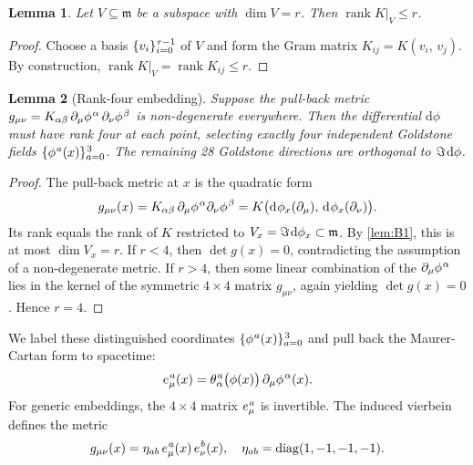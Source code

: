 \documentclass[pdflatex,sn-mathphys-num]{sn-jnl}
\theoremstyle{thmstyleone}
\newtheorem{lemma}{Lemma}
\theoremstyle{thmstyletwo}%
\theoremstyle{thmstylethree}%
\newcommand{\s}{\hspace{.1em}}
\newcommand{\sm}{\hspace{.065em}}
\newcommand{\smexp}[1]{^{\sm #1}}
\begin{document}
\begin{lemma}\label{lem:B1}
Let \(V\subseteq\mathfrak m\) be a subspace with $\dim V = r$.
Then \(\operatorname{rank} K|_{V} \leq r\).
\end{lemma}

\begin{proof}
Choose a basis \(\{v_{i}\}_{i=0}\smexp{r-1}\) of \(V\) and form the Gram
matrix \(K_{ij}=K(v_{i},\,v_{j})\).
By construction, \(\operatorname{rank} K|_{V}=\operatorname{rank} K_{ij} \le r\).
\end{proof}

\begin{lemma}[Rank-four embedding]\label{lem:Rank4}
Suppose the pull-back metric
$g_{\mu\nu}=K_{\alpha\beta}\,\partial_\mu\phi\smexp{\alpha}\,\partial_\nu\phi\smexp{\beta}$
is non-degenerate everywhere.
Then the differential $\mathrm d\phi$ must have rank four at each point,
selecting exactly four independent Goldstone fields
$\{\phi\smexp{ a}(x)\}_{a=0}\smexp3$.
The remaining 28 Goldstone directions are orthogonal to $\Im\s \mathrm d\phi$.
\end{lemma}

\begin{proof}
The pull-back metric at \(x\) is the quadratic form
\[
  g_{\mu\nu}(x)
  =K_{\alpha\beta}\,\partial_\mu\phi\smexp{\alpha}\partial_\nu\phi\smexp{\beta}
  =K\bigl(\mathrm d\sm\phi_x(\partial_\mu),\,
          \mathrm d\sm\phi_x(\partial_\nu)\bigr).
\]
Its rank equals the rank of \(K\) restricted to
\(V_x=\Im\s\mathrm d\phi_x\subset\mathfrak m\).
By \autoref{lem:B1}, this is at most \(\dim V_x=r\).
If \(r<4\), then \(\det g(x)=0\), contradicting the assumption of a non-degenerate
metric.
If \(r>4\), then some linear combination of the \(\partial_\mu\phi\smexp{\alpha}\)
lies in the kernel of the symmetric $4\times4$ matrix \(g_{\mu\nu}\), again yielding
\(\det g(x)=0\).
Hence \(r=4\).
\end{proof}

We label these distinguished coordinates $\{\phi\smexp{ a}(x)\}_{a=0}\smexp3$
and pull back the Maurer-Cartan form to spacetime:
\begin{equation}\label{eq:eDef}
  e_\mu\smexp{ a}(x)=
  \theta\smexp{ a}_{\alpha}\bigl(\phi(x)\bigr)\,
  \partial_\mu\phi\smexp{ \alpha}(x).
\end{equation}
For generic embeddings, the $4\times4$ matrix $e_\mu\smexp{ a}$ is
invertible. The induced vierbein defines the metric
\begin{equation}\label{eq:InducedMetric}
  g_{\mu\nu}(x)
  =\eta_{ab}\,e_\mu\smexp{ a}(x)\,e_\nu\smexp{ b}(x),
  \quad
  \eta_{ab}=\operatorname{diag}(1,-1,-1,-1).
\end{equation}
\end{document}
